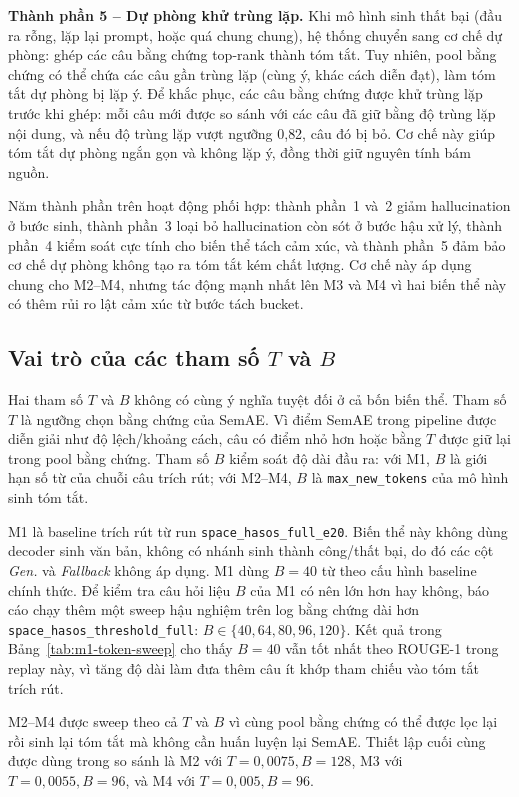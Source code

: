 \documentclass[12pt,a4paper]{report}
\begin{document}
\textbf{Thành phần 5 -- Dự phòng khử trùng lặp.} Khi mô hình sinh thất bại (đầu ra rỗng, lặp lại prompt, hoặc quá chung chung), hệ thống chuyển sang cơ chế dự phòng: ghép các câu bằng chứng top-rank thành tóm tắt. Tuy nhiên, pool bằng chứng có thể chứa các câu gần trùng lặp (cùng ý, khác cách diễn đạt), làm tóm tắt dự phòng bị lặp ý. Để khắc phục, các câu bằng chứng được khử trùng lặp trước khi ghép: mỗi câu mới được so sánh với các câu đã giữ bằng độ trùng lặp nội dung, và nếu độ trùng lặp vượt ngưỡng 0{,}82, câu đó bị bỏ. Cơ chế này giúp tóm tắt dự phòng ngắn gọn và không lặp ý, đồng thời giữ nguyên tính bám nguồn.

Năm thành phần trên hoạt động phối hợp: thành phần~1 và~2 giảm hallucination ở bước sinh, thành phần~3 loại bỏ hallucination còn sót ở bước hậu xử lý, thành phần~4 kiểm soát cực tính cho biến thể tách cảm xúc, và thành phần~5 đảm bảo cơ chế dự phòng không tạo ra tóm tắt kém chất lượng. Cơ chế này áp dụng chung cho M2--M4, nhưng tác động mạnh nhất lên M3 và M4 vì hai biến thể này có thêm rủi ro lật cảm xúc từ bước tách bucket.

\subsection{Vai trò của các tham số $T$ và $B$}

Hai tham số $T$ và $B$ không có cùng ý nghĩa tuyệt đối ở cả bốn biến thể. Tham số $T$ là ngưỡng chọn bằng chứng của SemAE. Vì điểm SemAE trong pipeline được diễn giải như độ lệch/khoảng cách, câu có điểm nhỏ hơn hoặc bằng $T$ được giữ lại trong pool bằng chứng. Tham số $B$ kiểm soát độ dài đầu ra: với M1, $B$ là giới hạn số từ của chuỗi câu trích rút; với M2--M4, $B$ là \texttt{max\_new\_tokens} của mô hình sinh tóm tắt.

M1 là baseline trích rút từ run \texttt{space\_hasos\_full\_e20}. Biến thể này không dùng decoder sinh văn bản, không có nhánh sinh thành công/thất bại, do đó các cột \textit{Gen.} và \textit{Fallback} không áp dụng. M1 dùng $B=40$ từ theo cấu hình baseline chính thức. Để kiểm tra câu hỏi liệu $B$ của M1 có nên lớn hơn hay không, báo cáo chạy thêm một sweep hậu nghiệm trên log bằng chứng dài hơn \texttt{space\_hasos\_threshold\_full}: $B \in \{40,64,80,96,120\}$. Kết quả trong Bảng~\ref{tab:m1-token-sweep} cho thấy $B=40$ vẫn tốt nhất theo ROUGE-1 trong replay này, vì tăng độ dài làm đưa thêm câu ít khớp tham chiếu vào tóm tắt trích rút.

M2--M4 được sweep theo cả $T$ và $B$ vì cùng pool bằng chứng có thể được lọc lại rồi sinh lại tóm tắt mà không cần huấn luyện lại SemAE. Thiết lập cuối cùng được dùng trong so sánh là M2 với $T=0{,}0075, B=128$, M3 với $T=0{,}0055, B=96$, và M4 với $T=0{,}005, B=96$.
\end{document}
